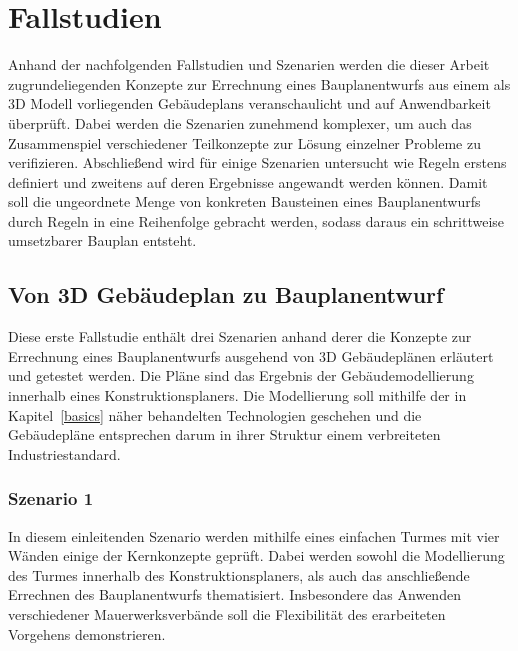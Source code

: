 \chapter{Fallstudien}\label{scenarios}
Anhand der nachfolgenden Fallstudien und Szenarien werden die dieser Arbeit zugrundeliegenden Konzepte zur Errechnung eines Bauplanentwurfs aus einem als 3D Modell vorliegenden Gebäudeplans veranschaulicht und auf Anwendbarkeit überprüft.
Dabei werden die Szenarien zunehmend komplexer, um auch das Zusammenspiel verschiedener Teilkonzepte zur Lösung einzelner Probleme zu verifizieren.
Abschließend wird für einige Szenarien untersucht wie Regeln erstens definiert und zweitens auf deren Ergebnisse angewandt werden können.
Damit soll die ungeordnete Menge von konkreten Bausteinen eines Bauplanentwurfs durch Regeln in eine Reihenfolge gebracht werden, sodass daraus ein schrittweise umsetzbarer Bauplan entsteht.

\section{Von 3D Gebäudeplan zu Bauplanentwurf}
Diese erste Fallstudie enthält drei Szenarien anhand derer die Konzepte zur Errechnung eines Bauplanentwurfs ausgehend von 3D Gebäudeplänen erläutert und getestet werden.
Die Pläne sind das Ergebnis der Gebäudemodellierung innerhalb eines Konstruktionsplaners.
Die Modellierung soll mithilfe der in Kapitel~\ref{basics} näher behandelten Technologien geschehen und die Gebäudepläne entsprechen darum in ihrer Struktur einem verbreiteten Industriestandard.

\subsection{Szenario 1}\label{scenarios:scenario1}
In diesem einleitenden Szenario werden mithilfe eines einfachen Turmes mit vier Wänden einige der Kernkonzepte geprüft.
Dabei werden sowohl die Modellierung des Turmes innerhalb des Konstruktionsplaners, als auch das anschließende Errechnen des Bauplanentwurfs thematisiert.
Insbesondere das Anwenden verschiedener Mauerwerksverbände soll die Flexibilität des erarbeiteten Vorgehens demonstrieren.
